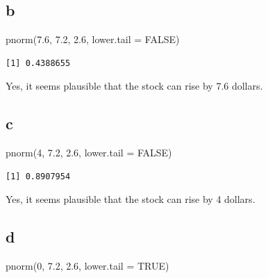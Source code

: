 \documentclass[
  letterpaper,
  DIV=11,
  numbers=noendperiod]{scrartcl}
\newenvironment{Shaded}{\begin{snugshade}}{\end{snugshade}}
\newcommand{\AttributeTok}[1]{\textcolor[rgb]{0.40,0.45,0.13}{#1}}
\newcommand{\ConstantTok}[1]{\textcolor[rgb]{0.56,0.35,0.01}{#1}}
\newcommand{\DecValTok}[1]{\textcolor[rgb]{0.68,0.00,0.00}{#1}}
\newcommand{\FloatTok}[1]{\textcolor[rgb]{0.68,0.00,0.00}{#1}}
\newcommand{\FunctionTok}[1]{\textcolor[rgb]{0.28,0.35,0.67}{#1}}
\newcommand{\NormalTok}[1]{\textcolor[rgb]{0.00,0.23,0.31}{#1}}
\begin{document}
\hypertarget{b-2}{%
\subsection{b}\label{b-2}}

\begin{Shaded}
\begin{Highlighting}[]
\FunctionTok{pnorm}\NormalTok{(}\FloatTok{7.6}\NormalTok{, }\FloatTok{7.2}\NormalTok{, }\FloatTok{2.6}\NormalTok{, }\AttributeTok{lower.tail =} \ConstantTok{FALSE}\NormalTok{)}
\end{Highlighting}
\end{Shaded}

\begin{verbatim}
[1] 0.4388655
\end{verbatim}

Yes, it seems plausible that the stock can rise by 7.6 dollars.

\hypertarget{c-1}{%
\subsection{c}\label{c-1}}

\begin{Shaded}
\begin{Highlighting}[]
\FunctionTok{pnorm}\NormalTok{(}\DecValTok{4}\NormalTok{, }\FloatTok{7.2}\NormalTok{, }\FloatTok{2.6}\NormalTok{, }\AttributeTok{lower.tail =} \ConstantTok{FALSE}\NormalTok{)}
\end{Highlighting}
\end{Shaded}

\begin{verbatim}
[1] 0.8907954
\end{verbatim}

Yes, it seems plausible that the stock can rise by 4 dollars.

\hypertarget{d-1}{%
\subsection{d}\label{d-1}}

\begin{Shaded}
\begin{Highlighting}[]
\FunctionTok{pnorm}\NormalTok{(}\DecValTok{0}\NormalTok{, }\FloatTok{7.2}\NormalTok{, }\FloatTok{2.6}\NormalTok{, }\AttributeTok{lower.tail =} \ConstantTok{TRUE}\NormalTok{)}
\end{Highlighting}
\end{Shaded}
\end{document}
